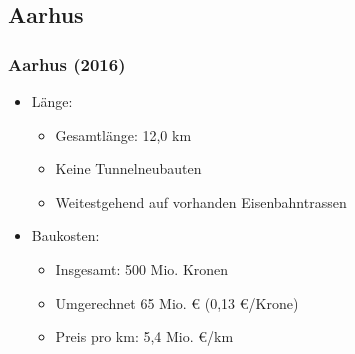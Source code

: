 \documentclass[xcolor=dvipsnames]{beamer}
\begin{document}
\subsection{Aarhus}
\begin{frame}
  \frametitle{Aarhus (2016)}

  \begin{itemize}
  \item Länge:
    \begin{itemize}
    \item Gesamtlänge: 12,0 km
    \item Keine Tunnelneubauten
    \item Weitestgehend auf vorhanden Eisenbahntrassen
    \end{itemize}
  \item Baukosten:
    \begin{itemize}
    \item Insgesamt: 500 Mio. Kronen
    \item Umgerechnet 65 Mio. € (0,13 €/Krone)
    \item Preis pro km: 5,4 Mio. €/km
    \end{itemize}
  \end{itemize}
\end{frame}

\end{document}
